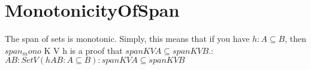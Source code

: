 \section{MonotonicityOfSpan}

\begin{theorem}
  \label{theorem : span_mono}
  \leanok
  The span of sets is monotonic. Simply, this means that if you have $h : A \subseteq B$, then $span_mono$ K V h is a proof that $span K V A \subseteq span K V B$.: ${A B : Set V} (hAB : A \subseteq B) : span K V A \subseteq span K V B$
\end{theorem}
